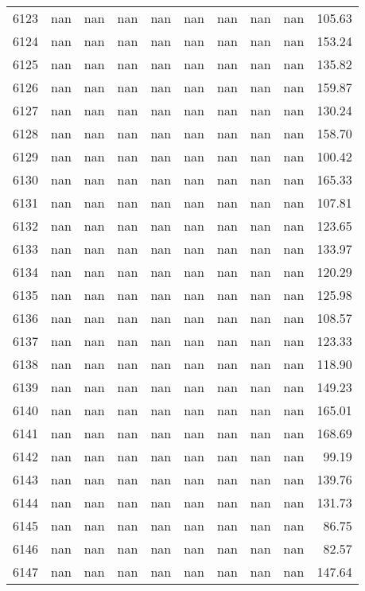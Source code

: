 \begin{tabular}{lrrrrrrrrr}
6123 & nan & nan & nan & nan & nan & nan & nan & nan & 105.63 \\
6124 & nan & nan & nan & nan & nan & nan & nan & nan & 153.24 \\
6125 & nan & nan & nan & nan & nan & nan & nan & nan & 135.82 \\
6126 & nan & nan & nan & nan & nan & nan & nan & nan & 159.87 \\
6127 & nan & nan & nan & nan & nan & nan & nan & nan & 130.24 \\
6128 & nan & nan & nan & nan & nan & nan & nan & nan & 158.70 \\
6129 & nan & nan & nan & nan & nan & nan & nan & nan & 100.42 \\
6130 & nan & nan & nan & nan & nan & nan & nan & nan & 165.33 \\
6131 & nan & nan & nan & nan & nan & nan & nan & nan & 107.81 \\
6132 & nan & nan & nan & nan & nan & nan & nan & nan & 123.65 \\
6133 & nan & nan & nan & nan & nan & nan & nan & nan & 133.97 \\
6134 & nan & nan & nan & nan & nan & nan & nan & nan & 120.29 \\
6135 & nan & nan & nan & nan & nan & nan & nan & nan & 125.98 \\
6136 & nan & nan & nan & nan & nan & nan & nan & nan & 108.57 \\
6137 & nan & nan & nan & nan & nan & nan & nan & nan & 123.33 \\
6138 & nan & nan & nan & nan & nan & nan & nan & nan & 118.90 \\
6139 & nan & nan & nan & nan & nan & nan & nan & nan & 149.23 \\
6140 & nan & nan & nan & nan & nan & nan & nan & nan & 165.01 \\
6141 & nan & nan & nan & nan & nan & nan & nan & nan & 168.69 \\
6142 & nan & nan & nan & nan & nan & nan & nan & nan & 99.19 \\
6143 & nan & nan & nan & nan & nan & nan & nan & nan & 139.76 \\
6144 & nan & nan & nan & nan & nan & nan & nan & nan & 131.73 \\
6145 & nan & nan & nan & nan & nan & nan & nan & nan & 86.75 \\
6146 & nan & nan & nan & nan & nan & nan & nan & nan & 82.57 \\
6147 & nan & nan & nan & nan & nan & nan & nan & nan & 147.64 \\

\end{tabular}

